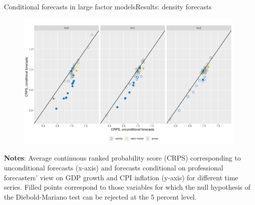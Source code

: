 \documentclass[xcolor=svgnames, 10pt, aspectratio=169]{beamer}
\begin{document}
\begin{frame}{Conditional forecasts in large factor models}{Results: density forecasts}
    \begin{figure}
        \includegraphics[scale = 0.4]{fig_eval_crps.pdf}  \vspace{0.1cm} \\
    \end{figure}

    \begin{adjustbox}{minipage=0.8\textwidth,center}
        {\tiny \textbf{Notes}: Average continuous ranked probability score (CRPS) corresponding to unconditional forecasts (x-axis) and forecasts conditional on professional forecasters’ view on GDP growth and CPI inflation (y-axis) for different time series. Filled points correspond to those variables for which the null hypothesis of the Diebold-Mariano test can be rejected at the 5 percent level.}\par
\end{adjustbox} 
\end{frame}
\end{document}
